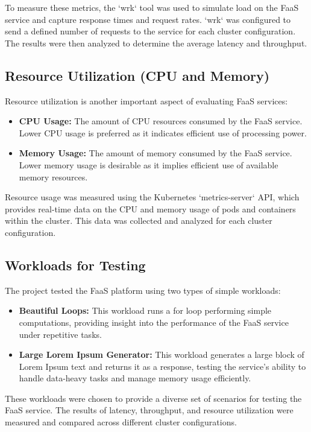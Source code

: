 \documentclass{article}
\begin{document}
To measure these metrics, the `wrk` tool was used to simulate load on the FaaS service and capture response times and request rates. `wrk` was configured to send a defined number of requests to the service for each cluster configuration. The results were then analyzed to determine the average latency and throughput.

\subsection{Resource Utilization (CPU and Memory)}
Resource utilization is another important aspect of evaluating FaaS services:

\begin{itemize}
    \item \textbf{CPU Usage:} The amount of CPU resources consumed by the FaaS service. Lower CPU usage is preferred as it indicates efficient use of processing power.
    \item \textbf{Memory Usage:} The amount of memory consumed by the FaaS service. Lower memory usage is desirable as it implies efficient use of available memory resources.
\end{itemize}

Resource usage was measured using the Kubernetes `metrics-server` API, which provides real-time data on the CPU and memory usage of pods and containers within the cluster. This data was collected and analyzed for each cluster configuration.

\subsection{Workloads for Testing}
The project tested the FaaS platform using two types of simple workloads:

\begin{itemize}
    \item \textbf{Beautiful Loops:} This workload runs a for loop performing simple computations, providing insight into the performance of the FaaS service under repetitive tasks.
    \item \textbf{Large Lorem Ipsum Generator:} This workload generates a large block of Lorem Ipsum text and returns it as a response, testing the service's ability to handle data-heavy tasks and manage memory usage efficiently.
\end{itemize}

These workloads were chosen to provide a diverse set of scenarios for testing the FaaS service. The results of latency, throughput, and resource utilization were measured and compared across different cluster configurations.
\end{document}
